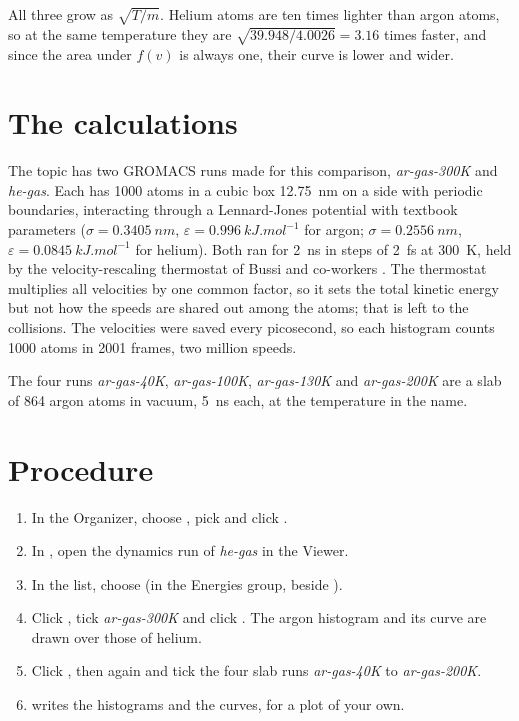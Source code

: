 All three grow as $\sqrt{T/m}$. Helium atoms are ten times lighter than argon atoms, so at the same temperature they are $\sqrt{39.948/4.0026} = 3.16$ times faster, and since the area under $f(v)$ is always one, their curve is lower and wider.

\section{The calculations}
The topic  has two GROMACS runs made for this comparison, \emph{ar-gas-300K} and \emph{he-gas}. Each has 1000 atoms in a cubic box \SI{12.75}{nm} on a side with periodic boundaries, interacting through a Lennard-Jones potential with textbook parameters ($\sigma = \SI{0.3405}{nm}$, $\varepsilon = \SI{0.996}{kJ.mol^{-1}}$ for argon; $\sigma = \SI{0.2556}{nm}$, $\varepsilon = \SI{0.0845}{kJ.mol^{-1}}$ for helium). Both ran for \SI{2}{ns} in steps of \SI{2}{fs} at \SI{300}{K}, held by the velocity-rescaling thermostat of Bussi and co-workers \cite{bussi2007}. The thermostat multiplies all velocities by one common factor, so it sets the total kinetic energy but not how the speeds are shared out among the atoms; that is left to the collisions. The velocities were saved every picosecond, so each histogram counts 1000 atoms in 2001 frames, two million speeds.

The four runs \emph{ar-gas-40K}, \emph{ar-gas-100K}, \emph{ar-gas-130K} and \emph{ar-gas-200K} are a slab of 864 argon atoms in vacuum, \SI{5}{ns} each, at the temperature in the name.

\section{Procedure}
\begin{enumerate}
	\item In the Organizer, choose , pick  and click .
	\item In , open the dynamics run of \emph{he-gas} in the Viewer.
	\item In the  list, choose  (in the Energies group, beside ).
	\item Click , tick \emph{ar-gas-300K} and click . The argon histogram and its curve are drawn over those of helium.
	\item Click , then  again and tick the four slab runs \emph{ar-gas-40K} to \emph{ar-gas-200K}.
	\item {} writes the histograms and the curves, for a plot of your own.
\end{enumerate}

